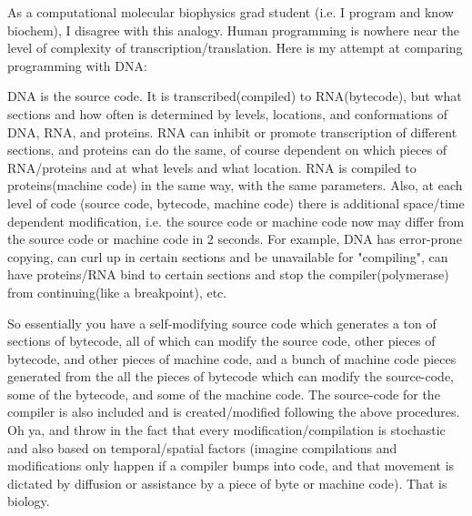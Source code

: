 As a computational molecular biophysics grad student (i.e. I program and know
biochem), I disagree with this analogy. Human programming is nowhere near the
level of complexity of transcription/translation. Here is my attempt at
comparing programming with DNA:

DNA is the source code. It is transcribed(compiled) to RNA(bytecode), but what
sections and how often is determined by levels, locations, and conformations of
DNA, RNA, and proteins. RNA can inhibit or promote transcription of different
sections, and proteins can do the same, of course dependent on which pieces of
RNA/proteins and at what levels and what location. RNA is compiled to
proteins(machine code) in the same way, with the same parameters. Also, at each
level of code (source code, bytecode, machine code) there is additional
space/time dependent modification, i.e. the source code or machine code now may
differ from the source code or machine code in 2 seconds. For example, DNA has
error-prone copying, can curl up in certain sections and be unavailable for
"compiling", can have proteins/RNA bind to certain sections and stop the
compiler(polymerase) from continuing(like a breakpoint), etc.

So essentially you have a self-modifying source code which generates a ton of
sections of bytecode, all of which can modify the source code, other pieces of
bytecode, and other pieces of machine code, and a bunch of machine code pieces
generated from the all the pieces of bytecode which can modify the source-code,
some of the bytecode, and some of the machine code. The source-code for the
compiler is also included and is created/modified following the above
procedures. Oh ya, and throw in the fact that every modification/compilation is
stochastic and also based on temporal/spatial factors (imagine compilations and
modifications only happen if a compiler bumps into code, and that movement is
dictated by diffusion or assistance by a piece of byte or machine code). That is
biology.

